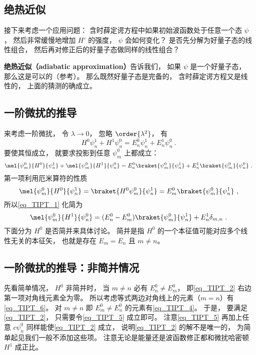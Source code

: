 \subsection{绝热近似}
接下来考虑一个应用问题： 含时薛定谔方程中如果初始波函数处于任意一个态 $\psi$， 然后非常缓慢地增加 $H'$ 的强度， $\psi$ 会如何变化？ 是否先分解为好量子态的线性组合， 然后再对修正后的好量子态做同样的线性组合？

\textbf{绝热近似（adiabatic approximation）}告诉我们， 如果 $\psi$ 是一个好量子态， 那么这是可以的（参考\cite{GriffQ}）。 那么既然好量子态是完备的， 含时薛定谔方程又是线性的， 上面的猜测的确成立。

\subsection{一阶微扰的推导}
来考虑一阶微扰， 令 $\lambda \to 0$， 忽略 $\order{\lambda^2}$， 有
\begin{equation}
H^0\psi_n^1 + H^1 \psi_n^0 = E_n^0 \psi_n^1 + E_n^1 \psi_n^0~.
\end{equation}
要使其恒成立， 就要求投影到任意 $\psi_m^0$ 上都成立：
\begin{equation}\label{eq_TIPT_1}
\mel{\psi_m^0}{H^0}{\psi_n^1} + \mel{\psi_m^0}{H^1}{\psi_n^0} = E_n^0 \braket{\psi_m^0}{\psi_n^1} + E_n^1 \braket{\psi_m^0}{\psi_n^0}~.
\end{equation}
第一项利用厄米算符的性质
\begin{equation}
\mel{\psi_m^0}{H^0}{\psi_n^1} = \braket{H^0\psi_m^0}{\psi_n^1} = E_m^0\braket{\psi_m^0}{\psi_n^1}~,
\end{equation}
所以\autoref{eq_TIPT_1} 化简为
\begin{equation}\label{eq_TIPT_2}
\mel{\psi_m^0}{H^1}{\psi_n^0} = (E_n^0 - E_m^0) \braket{\psi_m^0}{\psi_n^1} + E_n^1 \delta_{m,n}~.
\end{equation}
下面分为 $H^0$ 是否简并来具体讨论。 简并是指 $H^0$ 的一个本征值可能对应多个线性无关的本征矢， 也就是存在 $E_m=E_n$ 且 $m\ne n$。

\subsection{一阶微扰的推导：非简并情况}\label{sub_TIPT_1}
先看简单情况， $H^0$ 非简并时， 当 $m\ne n$ 必有 $E_n^0 \ne E_m^0$， 即\autoref{eq_TIPT_2} 右边第一项对角线元素全为零。 所以考虑等式两边对角线上的元素（$m = n$）有\autoref{eq_TIPT_6}。 对 $m \ne n$ 即 $E_m^0 \ne E_n^0$ 的元素有\autoref{eq_TIPT_4}。 于是， 要满足\autoref{eq_TIPT_2}， 只需要令\autoref{eq_TIPT_5} 成立即可。 注意\autoref{eq_TIPT_5} 再加上任意 $c \psi_n^0$ 同样能使\autoref{eq_TIPT_2} 成立， 说明\autoref{eq_TIPT_2} 的解不是唯一的， 为简单起见我们一般不添加这些项。 注意无论是能量还是波函数修正都和微扰哈密顿 $H^1$ 成正比。

